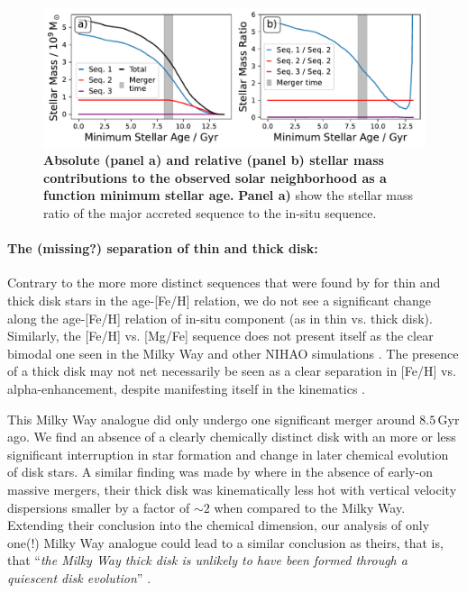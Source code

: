 \documentclass[fleqn,usenatbib]{mnras}
\begin{document}
\begin{figure}
	\includegraphics[width=\columnwidth]{figures/sequence_mass_ratios.pdf}
    \caption{
    \textbf{Absolute (panel a) and relative (panel b) stellar mass contributions to the observed solar neighborhood as a function minimum stellar age.}
    \textbf{Panel a)} show the stellar mass ratio of the major accreted sequence to the in-situ sequence.
    }
    \label{fig:sequence_mass_ratios}
\end{figure}

\paragraph*{The (missing?) separation of thin and thick disk:}
Contrary to the more more distinct sequences that were found by \cite{Nissen2020, Sahlholdt2022, Xiang2022} for thin and thick disk stars in the age-[Fe/H] relation, we do not see a significant change along the age-[Fe/H] relation of in-situ component (as in thin vs. thick disk). Similarly, the [Fe/H] vs. [Mg/Fe] sequence does not present itself as the clear bimodal one seen in the Milky Way \citep{Hayden2015} and other NIHAO simulations \citep{Buck2020, Buck2023}. The presence of a thick disk may not net necessarily be seen as a clear separation in [Fe/H] vs. alpha-enhancement, despite manifesting itself in the kinematics \citep[see e.g.][their Fig.~12]{MCM2013}.

This Milky Way analogue did only undergo one significant merger around $8.5\,\mathrm{Gyr}$ ago. We find an absence of a clearly chemically distinct disk with an more or less significant interruption in star formation and change in later chemical evolution of disk stars. A similar finding was made by \citet{MCM2013} where in the absence of early-on massive mergers, their thick disk was kinematically less hot with vertical velocity dispersions smaller by a factor of $\sim 2$ when compared to the Milky Way. Extending their conclusion into the chemical dimension, our analysis of only one(!) Milky Way analogue could lead to a similar conclusion as theirs, that is, that ``\textit{the Milky Way thick disk is unlikely to have been formed through a quiescent disk evolution}'' \citep{MCM2013}.
\end{document}
